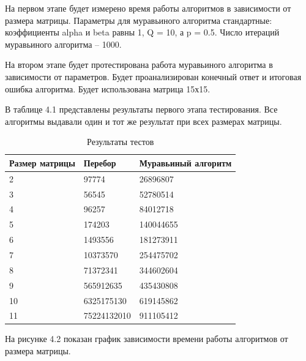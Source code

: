 На первом этапе будет измерено время работы алгоритмов в зависимости от размера матрицы.
Параметры для муравьиного алгоритма стандартные: коэффициенты alpha и beta равны 1, Q = 10, а p = 0.5. 
Число итераций муравьиного алгоритма -- 1000.

На втором этапе будет протестирована работа муравьиного алгоритма в зависимости от параметров.
Будет проанализирован конечный ответ и итоговая ошибка алгоритма.
Будет использована матрица 15х15.

В таблице 4.1 представлены результаты первого этапа тестирования. 
Все алгоритмы выдавали один и тот же результат при всех размерах матрицы. 
\FloatBarrier
\begin{table}[h]
	\caption{Результаты тестов}
	\centering
	\begin{tabular}{ | l | l | l |}
		\hline
		Размер матрицы & Перебор & Муравьиный алгоритм\\ 
		\hline
		2 & 97774 & 26896807 \\
		3 & 56545 & 52780514 \\
		4 & 96257 & 84012718 \\
		5 & 174203 & 140044655 \\
		6 & 1493556 & 181273911 \\
		7 & 10373570 & 254475702 \\
		8 & 71372341 & 344602604 \\ 
		9 & 565912635 & 435430808 \\
		10 & 6325175130 & 619145862 \\ 
		11 & 75224132010 & 911105412 \\
		\hline
	\end{tabular}
\end{table}
\FloatBarrier

На рисунке 4.2 показан график зависимости времени работы алгоритмов от размера матрицы.

